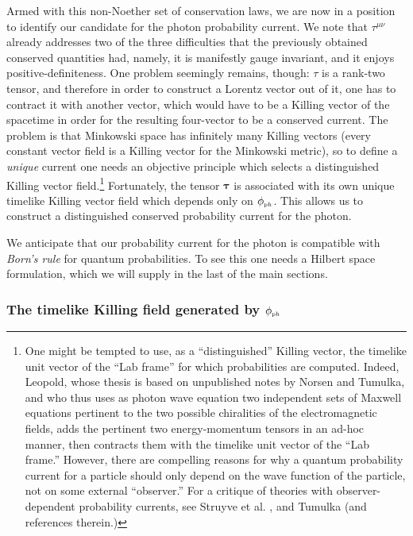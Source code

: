 \documentclass[12pt]{article}
\theoremstyle{definition}
\numberwithin{equation}{section}
\newcommand{\phiPH}{{\phi_{\mbox{\rm\tiny ph}}}}
\begin{document}
 Armed with this non-Noether set of conservation laws, we are now in a position to identify our candidate for the photon probability current. 
 We note that $\tau^{\mu\nu}$ already addresses two of the three difficulties that the previously obtained conserved quantities had,
 namely, it is manifestly gauge invariant, and it enjoys positive-definiteness. 
 One  problem seemingly remains, though: $\tau$ is a rank-two tensor, and therefore in order to construct a Lorentz vector out of it, 
one has to contract it with another vector, which would have to be a Killing vector of the spacetime in order for the resulting 
four-vector to be a conserved current.
 The problem is that Minkowski space has infinitely many Killing vectors (every constant vector field is a Killing vector for the 
Minkowski metric), so to define a {\em unique} current one needs an objective principle which selects a distinguished Killing vector 
field.\footnote{\label{LabFrame}One might be tempted to use,  as a ``distinguished'' Killing vector,
the timelike unit vector of the ``Lab frame'' for which probabilities are computed.
 Indeed, Leopold, whose thesis \cite{Leopold} is based on unpublished notes by Norsen and Tumulka, 
and who thus uses as photon wave equation two independent sets of Maxwell equations pertinent to the two possible chiralities of the
electromagnetic fields, adds the pertinent two energy-momentum tensors in an ad-hoc manner, then contracts them with the timelike 
unit vector of the ``Lab frame.''
 However, there are compelling reasons for why a quantum probability current for a particle should only depend on the wave function 
of the particle, not on some external ``observer.''
 For a critique of theories with observer-dependent probability currents, see Struyve et al. \cite{WardETal}, and 
Tumulka \cite{RodiUnromantic} (and references therein.)}  
 Fortunately, the tensor $\boldsymbol{\tau}$ is associated with its own unique timelike Killing vector field which 
depends only on $\phiPH$. 
 This allows us to construct a distinguished conserved probability current for the photon. 
 
 We anticipate that our probability current for the photon is compatible with {\em Born's rule} for quantum probabilities. 
 To see this one needs a Hilbert space formulation, which we will supply in the last of the main sections. 

 \subsubsection{The timelike Killing field generated by $\phiPH$}
\end{document}
